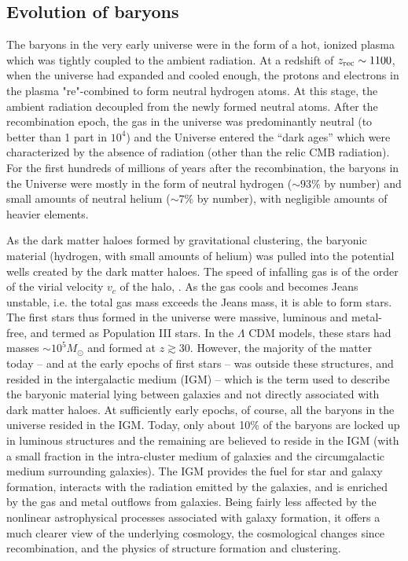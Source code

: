 \subsection{Evolution of baryons}
The baryons in the very early universe were in the form of a hot, ionized plasma which was tightly coupled to the ambient radiation. At a redshift of $z_{\rm rec} \sim 1100$,  when the universe had expanded and cooled enough, the protons and electrons in the plasma "re"-combined to form neutral hydrogen atoms. At this stage, the ambient radiation decoupled from the newly formed neutral atoms.
After the recombination epoch, the gas in the universe was predominantly neutral (to better than 1 part in $10^4$) and the Universe entered the ``dark ages'' which were characterized by the absence of radiation (other than the relic CMB radiation). For the first hundreds of millions of years after the recombination, the baryons in the Universe were mostly in the form of neutral hydrogen ($\sim 93\%$ by number) and small amounts of neutral helium ($\sim 7\%$ by number), with negligible amounts of heavier elements.

As the dark matter haloes formed by gravitational clustering, the baryonic material (hydrogen, with small amounts of helium) was pulled into the potential wells created by the dark matter haloes. The speed of infalling gas is of the order of the virial velocity $v_c$ of the halo, . As the gas cools and becomes Jeans unstable, i.e. the total gas mass exceeds the Jeans mass, it is able to form stars.  The first stars thus formed in the universe were massive, luminous and metal-free,  and termed as Population III stars. In the $\Lambda$ CDM models, these stars had masses $\sim 10^5 M_{\odot}$ and formed at $z \gtrsim 30$. However, the majority of the matter today -- and at the early epochs of first stars -- was outside these structures, and resided in the intergalactic medium (IGM) -- which is the term used to describe the baryonic material lying between galaxies and not directly associated with dark matter haloes.  At sufficiently early epochs, of course, all the baryons in the universe resided in the IGM. Today, only about 10\% of the baryons are locked up in luminous structures and the remaining are believed to reside in the IGM (with a small fraction in the intra-cluster medium of galaxies and the circumgalactic medium surrounding galaxies). The IGM provides the fuel for star and galaxy formation, interacts with the radiation emitted by the galaxies, and is enriched by the gas and metal outflows from galaxies. Being fairly less affected by the nonlinear astrophysical processes associated with galaxy formation, it offers a much clearer view of the underlying cosmology, the cosmological changes since recombination, and the physics of structure formation and clustering. 

